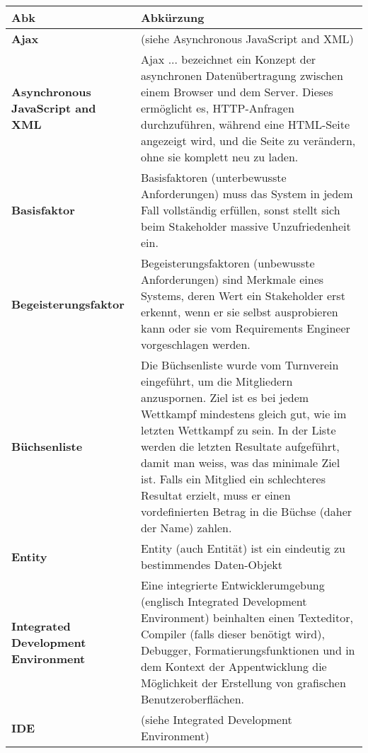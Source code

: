 \begin{longtable}{|m{3cm}|m{11cm}|}\hline	
	\rowcolor{gray} \textbf{Abk}&
	Abkürzung \\ \hline		


	\textbf{Ajax}&
	(siehe Asynchronous JavaScript and XML)\\ \hline	

	\textbf{Asynchronous JavaScript and XML}&
	Ajax ... bezeichnet ein Konzept der asynchronen Datenübertragung zwischen einem Browser und dem Server. Dieses ermöglicht es, HTTP-Anfragen durchzuführen, während eine HTML-Seite angezeigt wird, und die Seite zu verändern, ohne sie komplett neu zu laden.\cite{wiki_ajax}\\ \hline	

	\textbf{Basisfaktor}&
	Basisfaktoren (unterbewusste Anforderungen) muss das System in jedem Fall vollständig erfüllen, sonst stellt sich beim Stakeholder massive Unzufriedenheit ein. \cite{req_eng_book}\\ \hline	

	\textbf{Begeisterungsfaktor}&
	Begeisterungsfaktoren (unbewusste Anforderungen) sind Merkmale eines Systems, deren Wert ein Stakeholder erst erkennt, wenn er sie selbst ausprobieren kann oder sie vom Requirements Engineer vorgeschlagen werden.\cite{req_eng_book}\\ \hline	

	\textbf{Büchsenliste}&
	Die Büchsenliste wurde vom Turnverein eingeführt, um die Mitgliedern anzuspornen. Ziel ist es bei jedem Wettkampf mindestens gleich gut, wie im letzten Wettkampf zu sein. In der Liste werden die letzten Resultate aufgeführt, damit man weiss, was das minimale Ziel ist. Falls ein Mitglied ein schlechteres Resultat erzielt, muss er einen vordefinierten Betrag in die Büchse (daher der Name) zahlen.\\ \hline	

	\textbf{Entity}&
	Entity (auch Entität) ist ein eindeutig zu bestimmendes Daten-Objekt \\ \hline	

	\textbf{Integrated Development Environment}&
	Eine integrierte Entwicklerumgebung (englisch Integrated Development Environment) beinhalten einen Texteditor, Compiler (falls dieser benötigt wird), Debugger, Formatierungsfunktionen und in dem Kontext der Appentwicklung die Möglichkeit der Erstellung von grafischen Benutzeroberflächen.\\ \hline

	\textbf{IDE}&
	(siehe Integrated Development Environment)\\ \hline


\end{longtable}
